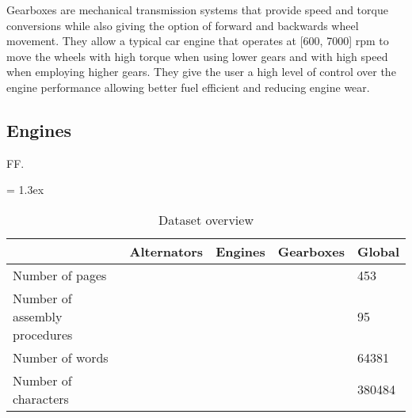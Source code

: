 Gearboxes are mechanical transmission systems that provide speed and torque conversions while also giving the option of forward and backwards wheel movement. They allow a typical car engine that operates at [600, 7000] \gls{rpm} to move the wheels with high torque when using lower gears and with high speed when employing higher gears. They give the user a high level of control over the engine performance allowing better fuel efficient and reducing engine wear.




\subsection{Engines}

FF.



\begin{table*}[t]
	\caption{Dataset overview}
	\tabulinesep = 1.3ex
	\centering
	\begin{tabu} { X[2.5,m,c] | X[m,c] X[m,c] X[m,c] X[m,c] }
		\rowfont{\bfseries\itshape} 	& Alternators									& Engines																& Gearboxes 										& Global 	\\
		\hline
		Number of pages 				& 			& 						& 			& 453		\\
		Number of assembly procedures 	& 				& 							& 				& 95		\\
		Number of words					& 	& 		& 		& 64381		\\
		Number of characters			& 	& 	& 	& 380484	\\
	\end{tabu}
	\label{tab:dataset-sources_dataset-overview}
\end{table*}
